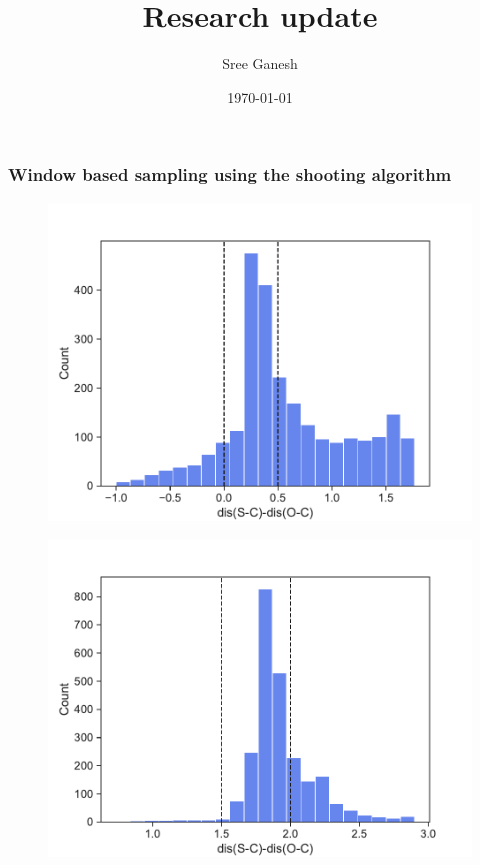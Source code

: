 \documentclass[a4paper,8pt]{beamer}
\title[Free energy]{Research update}
\date{\today}
\author{Sree Ganesh}
\institute[U of A]{Schwartz Group \\ University of Arizona}
\begin{document}
\maketitle
%
%
\begin{frame}
\frametitle{Window based sampling using the shooting algorithm}
    \begin{figure}[ht]
        \begin{minipage}[b]{0.45\linewidth}
            \centering
            \includegraphics[width=\textwidth]{figures/window1.pdf}
            \label{fig:a}
        \end{minipage}
        \hspace{0.5cm}
        \begin{minipage}[b]{0.45\linewidth}
            \centering
            \includegraphics[width=\textwidth]{figures/window2.pdf}
            \label{fig:b}
        \end{minipage}
    \end{figure}
\end{frame}
\end{document}
